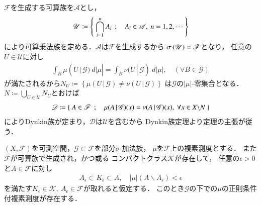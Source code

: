 	\begin{prf}
		$\mathscr{F}$を生成する可算族を$\mathscr{A}$とし，
		\begin{align}
			\mathscr{U} \coloneqq \left\{\ \bigcap_{i=1}^n A_i\ \, ; \quad A_i \in \mathscr{A},\ n = 1,2,\cdots\ \right\}
		\end{align}
		により可算乗法族を定める．$\mathscr{A}$は$\mathscr{F}$を生成するから
		$\sigma \left(\mathscr{U}\right) = \mathscr{F}$となり，
		任意の$U \in \mathscr{U}$に対し
		\begin{align}
			\int_{B} \mu(U\, |\, \mathscr{G})\ d|\mu|
			= \int_{B} \nu(U\, |\, \mathscr{G})\ d|\mu|,
			\quad (\forall B \in \mathscr{G})
		\end{align}
		が満たされるから$N_U \coloneqq \left\{\mu(U\, |\, \mathscr{G}) \neq \nu(U\, |\, \mathscr{G}) \right\}$
		は$\mathscr{G}$の$|\mu|$-零集合となる．$N \coloneqq \bigcup_{U \in \mathscr{U}} N_U$とおけば
		\begin{align}
			\mathscr{D} \coloneqq \Set{A \in \mathscr{F}}{\mu(A\, |\, \mathscr{G})(x) = \nu(A\, |\, \mathscr{G})(x),\ 
			\forall x \in X \backslash N}
		\end{align}
		によりDynkin族が定まり，$\mathscr{D}$は$\mathscr{U}$を含むから
		Dynkin族定理より定理の主張が従う．
		\QED
	\end{prf}
	
	\begin{screen}
		\begin{thm}[正則条件付複素測度の存在]
			$(X,\mathscr{F})$を可測空間，$\mathscr{G} \subset \mathscr{F}$を部分$\sigma$-加法族，
			$\mu$を$\mathscr{F}$上の複素測度とする．
			また$\mathscr{F}$が可算族で生成され，かつ或る
			コンパクトクラス$\mathcal{K}$が存在して，
			任意の$\epsilon > 0$と$A \in \mathscr{F}$に対し
			\begin{align}
				A_\epsilon \subset K_\epsilon \subset A,\quad |\mu|(A \backslash A_\epsilon) < \epsilon
			\end{align}
			を満たす$K_\epsilon \in \mathcal{K},\ A_\epsilon \in \mathscr{F}$が取れると仮定する．
			このとき$\mathscr{G}$の下での$\mu$の正則条件付複素測度が存在する．
		\end{thm}
	\end{screen}